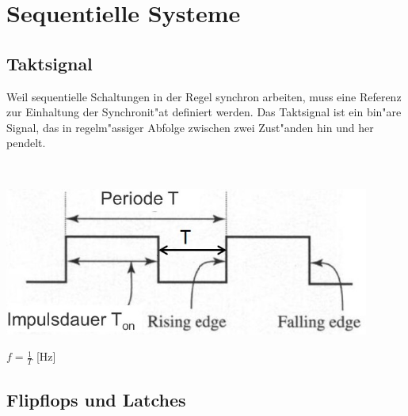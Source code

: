 \section{Sequentielle Systeme}

\subsection{Taktsignal}
	\begin{minipage}{8 cm}
		Weil sequentielle Schaltungen in der Regel synchron arbeiten, muss eine Referenz zur Einhaltung der Synchronit"at definiert werden. Das Taktsignal ist ein bin"are Signal, das in regelm"assiger Abfolge zwischen zwei Zust"anden hin und her pendelt.
	\end{minipage}
	\begin{minipage}{0.5 cm}
		\ 
	\end{minipage}
	\begin{minipage}{7 cm}
		\includegraphics[width=0.9\textwidth]{pics/taktsignal}
	\end{minipage}
	\begin{minipage}{2 cm}
		$f=\frac{1}{T}$ [Hz]
	\end{minipage}

\subsection{Flipflops und Latches}
